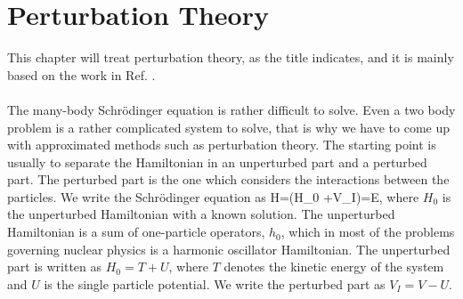 \chapter{Perturbation Theory}
\label{projection}

This chapter will treat perturbation theory, as the title indicates, and it is mainly based on the work in Ref. \cite{realeff}.\\
\\
The many-body Schr\" odinger equation is rather difficult to solve. 
Even a two body problem is a rather complicated system to solve, that is why
we have to come up with approximated methods such as perturbation theory.
The starting point is usually to separate the Hamiltonian 
in an unperturbed part and a perturbed part. The perturbed part is
the one which considers the interactions between the particles. We write the Schr\"odinger equation as
\be
H\Psi=(H_0 +V_I)\Psi=E\Psi,
\ee
where $H_0$ is the unperturbed Hamiltonian with a known solution. The unperturbed Hamiltonian is a sum of one-particle operators, $h_0$, 
which in most of the problems governing nuclear physics is a harmonic 
oscillator Hamiltonian. The unperturbed part is written as $H_0=T + U$,
where $T$ denotes the kinetic energy of the system and $U$ is the single 
particle potential. We write  the 
perturbed part as $V_I = V-U.$

